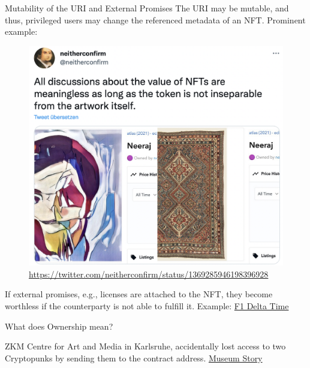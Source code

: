 \documentclass[handout]{beamer}
\begin{document}
\begin{frame}{Mutability of the URI and External Promises}
		The URI may be mutable, and thus, privileged users may change the referenced metadata of an NFT. Prominent example: 
		\vspace{0.5em}
		\begin{figure}
				\centering
				\includegraphics[scale=0.2]{../assets/images/rugpull.png}
				\caption*{\link \href{https://twitter.com/neitherconfirm/status/1369285946198396928}{\tiny https://twitter.com/neitherconfirm/status/1369285946198396928}}	
			\end{figure}	
		If external promises, e.g., licenses are attached to the NFT, they become worthless if the counterparty is not able to fulfill it. Example: \href{https://www.pcgamer.com/f1-delta-time-one-of-the-first-major-nft-games-has-shut-down/}{\link F1 Delta Time}
\end{frame}

\begin{frame}{What does Ownership mean?}

ZKM Centre for Art and Media in Karlsruhe, accidentally lost access to two Cryptopunks by sending them to the contract address.
	\href{https://www.theartnewspaper.com/2022/01/21/a-german-museum-has-accidentally-lost-access-to-two-highly-valuable-nfts}{\link Museum Story}
\end{frame}
\end{document}
